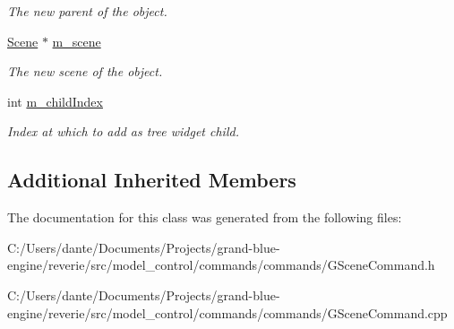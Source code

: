 \begin{Indent}
\begin{DoxyCompactItemize}
\begin{DoxyCompactList}\small\item\em The new parent of the object. \end{DoxyCompactList}\item 
\mbox{\label{classrev_1_1_reparent_scene_object_command_a494c27b37fce1ebf58a851fdacff4735}} 
\mbox{\hyperlink{classrev_1_1_scene}{Scene}} $\ast$ \mbox{\hyperlink{classrev_1_1_reparent_scene_object_command_a494c27b37fce1ebf58a851fdacff4735}{m\+\_\+scene}}
\begin{DoxyCompactList}\small\item\em The new scene of the object. \end{DoxyCompactList}\item 
\mbox{\label{classrev_1_1_reparent_scene_object_command_a2ed8e5e38c66062bb941508c332b3124}} 
int \mbox{\hyperlink{classrev_1_1_reparent_scene_object_command_a2ed8e5e38c66062bb941508c332b3124}{m\+\_\+child\+Index}}
\begin{DoxyCompactList}\small\item\em Index at which to add as tree widget child. \end{DoxyCompactList}\end{DoxyCompactItemize}
\end{Indent}
\subsection*{Additional Inherited Members}


The documentation for this class was generated from the following files\+:\begin{DoxyCompactItemize}
\item 
C\+:/\+Users/dante/\+Documents/\+Projects/grand-\/blue-\/engine/reverie/src/model\+\_\+control/commands/commands/G\+Scene\+Command.\+h\item 
C\+:/\+Users/dante/\+Documents/\+Projects/grand-\/blue-\/engine/reverie/src/model\+\_\+control/commands/commands/G\+Scene\+Command.\+cpp\end{DoxyCompactItemize}
